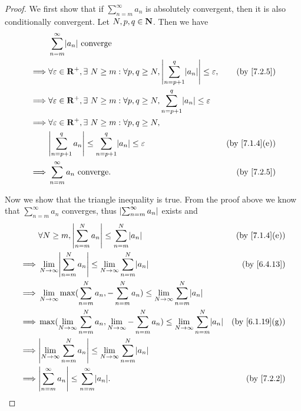 \begin{proof}
  We first show that if \(\sum_{n = m}^\infty a_n\) is absolutely convergent, then it is also conditionally convergent.
  Let \(N, p, q \in \mathbf{N}\).
  Then we have
  \begin{align*}
             & \sum_{n = m}^\infty \abs{a_n} \text{ converge}                                                                                                            \\
    \implies & \forall \varepsilon \in \R^+, \exists\ N \geq m : \forall p, q \geq N, \abs{\sum_{n = p + 1}^q \abs{a_n}} \leq \varepsilon, & \text{(by \cref{7.2.5})}    \\
    \implies & \forall \varepsilon \in \R^+, \exists\ N \geq m : \forall p, q \geq N, \sum_{n = p + 1}^q \abs{a_n} \leq \varepsilon                                      \\
    \implies & \forall \varepsilon \in \R^+, \exists\ N \geq m : \forall p, q \geq N,                                                                                    \\
             & \abs{\sum_{n = p + 1}^q a_n} \leq \sum_{n = p + 1}^q \abs{a_n} \leq \varepsilon                                             & \text{(by \cref{7.1.4}(e))} \\
    \implies & \sum_{n = m}^\infty a_n \text{ converge}.                                                                                   & \text{(by \cref{7.2.5})}
  \end{align*}

  Now we show that the triangle inequality is true.
  From the proof above we know that \(\sum_{n = m}^\infty a_n\) converges, thus \(\left\lvert\sum_{n = m}^\infty a_n\right\rvert\) exists and
  \begin{align*}
             & \forall N \geq m, \abs{\sum_{n = m}^N a_n} \leq \sum_{n = m}^N \abs{a_n}                                                                & \text{(by \cref{7.1.4}(e))}  \\
    \implies & \lim_{N \to \infty} \abs{\sum_{n = m}^N a_n} \leq \lim_{N \to \infty} \sum_{n = m}^N \abs{a_n}                                          & \text{(by \cref{6.4.13})}    \\
    \implies & \lim_{N \to \infty} \max(\sum_{n = m}^N a_n, -\sum_{n = m}^N a_n) \leq \lim_{N \to \infty} \sum_{n = m}^N \abs{a_n}                                                    \\
    \implies & \max(\lim_{N \to \infty} \sum_{n = m}^N a_n, \lim_{N \to \infty} -\sum_{n = m}^N a_n) \leq \lim_{N \to \infty} \sum_{n = m}^N \abs{a_n} & \text{(by \cref{6.1.19}(g))} \\
    \implies & \abs{\lim_{N \to \infty} \sum_{n = m}^N a_n} \leq \lim_{N \to \infty} \sum_{n = m}^N \abs{a_n}                                                                         \\
    \implies & \abs{\sum_{n = m}^\infty a_n} \leq \sum_{n = m}^\infty \abs{a_n}.                                                                       & \text{(by \cref{7.2.2})}
  \end{align*}
\end{proof}

